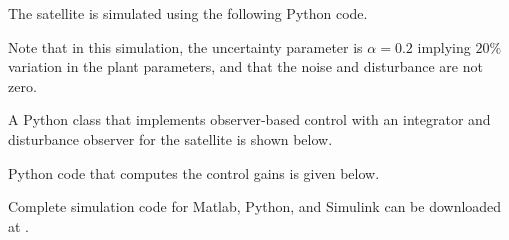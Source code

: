 The satellite is simulated using the following Python code.

Note that in this simulation, the uncertainty parameter is $\alpha=0.2$ implying $20\%$ variation in the plant parameters, and that the noise and disturbance are not zero.

A Python class that implements observer-based control with an integrator and disturbance observer for the satellite is shown below.


Python code that computes the control gains is given below.


Complete simulation code for Matlab, Python, and Simulink can be downloaded at .


%
%
%



